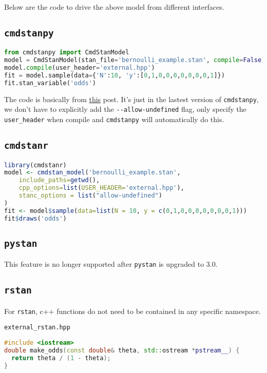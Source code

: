 \documentclass[11pt]{article}
\begin{document}
Below are the code to drive the above model from different interfaces.


\cprotect\subsection{\verb|cmdstanpy|}
\begin{lstlisting}[language=python, style=lgeneral]
from cmdstanpy import CmdStanModel
model = CmdStanModel(stan_file='bernoulli_example.stan', compile=False)
model.compile(user_header='external.hpp')
fit = model.sample(data={'N':10, 'y':[0,1,0,0,0,0,0,0,0,1]})
fit.stan_variable('odds')
\end{lstlisting}

The code is basically from \href{https://mc-stan.org/cmdstanpy/users-guide/examples/Using\%20External\%20C\%2B\%2B.html#}{this} post. It's just in the lastest version of \verb|cmdstanpy|, we don't have to explicitly add the \verb|--allow-undefined| flag, only specify the \verb|user_header| when compile and \verb|cmdstanpy| will automatically do this.


\cprotect\subsection{\verb|cmdstanr|}
\begin{lstlisting}[language=r, style=lgeneral]
library(cmdstanr)
model <- cmdstan_model('bernoulli_example.stan', 
    include_paths=getwd(),
    cpp_options=list(USER_HEADER='external.hpp'),
    stanc_options = list("allow-undefined")
)
fit <- model$sample(data=list(N = 10, y = c(0,1,0,0,0,0,0,0,0,1)))
fit$draws('odds')
\end{lstlisting}


\cprotect\subsection{\verb|pystan|}
This feature is no longer supported after \verb|pystan| is upgraded to 3.0.



\cprotect\subsection{\verb|rstan|}
For \verb|rstan|, c++ functions do not need to be contained in any specific namespace. 

\verb|external_rstan.hpp|
\begin{lstlisting}[language=c++, style=lgeneral]
#include <iostream>
double make_odds(const double& theta, std::ostream *pstream__) {
  return theta / (1 - theta);
}
\end{lstlisting}
\end{document}
